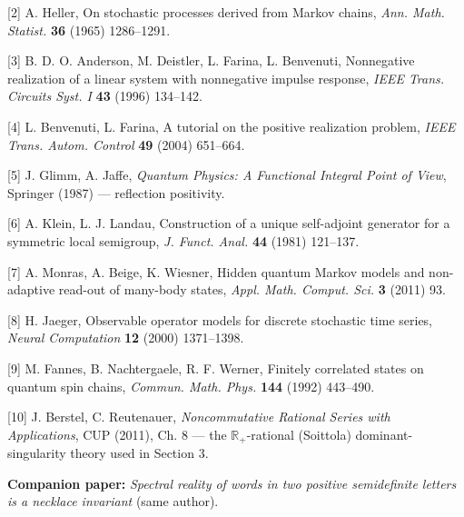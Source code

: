 \documentclass[11pt]{article}
\begin{document}
[2] A. Heller, On stochastic processes derived from Markov chains, \emph{Ann. Math. Statist.} \textbf{36} (1965) 1286–1291.

[3] B. D. O. Anderson, M. Deistler, L. Farina, L. Benvenuti, Nonnegative realization of a linear system with nonnegative impulse response, \emph{IEEE Trans. Circuits Syst. I} \textbf{43} (1996) 134–142.

[4] L. Benvenuti, L. Farina, A tutorial on the positive realization problem, \emph{IEEE Trans. Autom. Control} \textbf{49} (2004) 651–664.

[5] J. Glimm, A. Jaffe, \emph{Quantum Physics: A Functional Integral Point of View}, Springer (1987) — reflection positivity.

[6] A. Klein, L. J. Landau, Construction of a unique self-adjoint generator for a symmetric local semigroup, \emph{J. Funct. Anal.} \textbf{44} (1981) 121–137.

[7] A. Monras, A. Beige, K. Wiesner, Hidden quantum Markov models and non-adaptive read-out of many-body states, \emph{Appl. Math. Comput. Sci.} \textbf{3} (2011) 93.

[8] H. Jaeger, Observable operator models for discrete stochastic time series, \emph{Neural Computation} \textbf{12} (2000) 1371–1398.

[9] M. Fannes, B. Nachtergaele, R. F. Werner, Finitely correlated states on quantum spin chains, \emph{Commun. Math. Phys.} \textbf{144} (1992) 443–490.

[10] J. Berstel, C. Reutenauer, \emph{Noncommutative Rational Series with Applications}, CUP (2011), Ch. 8 — the $\mathbb R_+$-rational (Soittola) dominant-singularity theory used in Section 3.

\textbf{Companion paper:} \emph{Spectral reality of words in two positive semidefinite letters is a necklace invariant} (same author).
\end{document}
